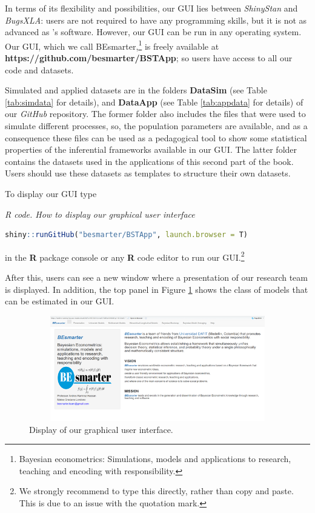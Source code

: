 In terms of its flexibility and possibilities, our GUI lies between \textit{ShinyStan} and \textit{BugsXLA}: users are not required to have any programming skills, but it is not as advanced as \cite{Karabatsos2016}'s software. However, our GUI can be run in any operating system. Our GUI, which we call BEsmarter,\footnote{Bayesian econometrics: Simulations, models and applications to research, teaching and encoding with responsibility.} is freely available at \textbf{https://github.com/besmarter/BSTApp}; so users have access to all our code and datasets. 

Simulated and applied datasets are in the folders \textbf{DataSim} (see Table \ref{tab:simdata} for details), and \textbf{DataApp} (see Table \ref{tab:appdata} for details) of our \textit{GitHub} repository. The former folder also includes the files that were used to simulate different processes, so, the population parameters are available, and as a consequence these files can be used as a pedagogical tool to show some statistical properties of the inferential frameworks available in our GUI. The latter folder contains the datasets used in the applications of this second part of the book. Users should use these datasets as templates to structure their own datasets. 

To display our GUI type

\begin{tcolorbox}[enhanced,width=4.67in,center upper,
	fontupper=\large\bfseries,drop shadow southwest,sharp corners]
	\textit{R code. How to display our graphical user interface}
	\begin{VF}
		\begin{lstlisting}[language=R]
		shiny::runGitHub("besmarter/BSTApp", launch.browser = T)
		\end{lstlisting}
	\end{VF}
\end{tcolorbox} 


in the \textbf{R} package console or any \textbf{R} code editor to run our GUI.\footnote{We strongly recommend to type this directly, rather than copy and paste. This is due to an issue with the quotation mark.}

After this, users can see a new window where a presentation of our research team is displayed. In addition, the top panel in Figure \ref{fig61} shows the class of models that can be estimated in our GUI.

\begin{figure}
	\includegraphics[width=340pt, height=130pt]{Chapters/chapterGUI/figures/Figure1.png}
	\caption[List of figure caption goes here]{Display of our graphical user interface.}\label{fig61}
\end{figure}


